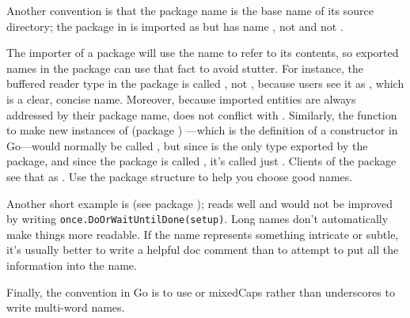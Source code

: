 Another convention is that the package name is the base name of its
source directory; the package in  is imported as
 but has name , not
 and not
.

The importer of a package will use the name to refer to its contents, so 
exported names in the package can use that fact to avoid
stutter. For instance, the buffered reader type in the
package is
called , not , because users see it as
,
which is a clear, concise name. Moreover, because imported entities are
always addressed by their package name,  does not conflict
with . Similarly, the function to make new instances of
 (package ) ---which is the definition of a constructor in Go---would normally
be called , but since  is the only type exported by the
package, and since the package is called
, it's called
just .
Clients of the package see that as . Use the package structure
to help you choose good names.

Another short example is  (see package );  reads well and would
not be improved by writing \lstinline{once.DoOrWaitUntilDone(setup)}. Long names
don't automatically make things more readable. If the name represents
something intricate or subtle, it's usually better to write a helpful
doc comment than to attempt to put all the information into the name.

Finally, the convention in Go is to use  or mixedCaps rather
than underscores to write multi-word names.


